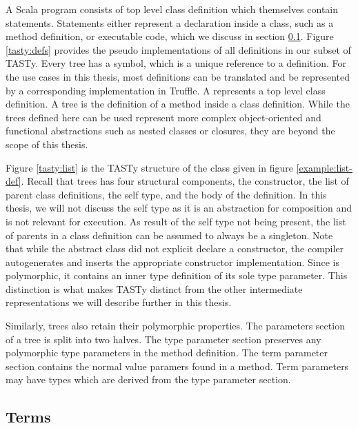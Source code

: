 A Scala program consists of top level class definition which themselves contain statements.
Statements either represent a declaration inside a class, such as a method definition, or executable code, which we discuss in section \ref{section:tasty:terms}.
Figure \ref{tasty:defs} provides the pseudo implementations of all definitions in our subset of TASTy.
Every tree has a symbol, which is a unique reference to a definition.
For the use cases in this thesis, most definitions can be translated and be represented by a corresponding implementation in Truffle.
A  represents a top level class definition.
A  tree is the definition of a method inside a class definition.
While the trees defined here can be used represent more complex object-oriented and functional abstractions such as nested classes or closures, they are beyond the scope of this thesis.

Figure \ref{tasty:list} is the TASTy structure of the  class given in figure \ref{example:list-def}. 
Recall that  trees has four structural components, the constructor, the list of parent class definitions, the self type, and the body of the definition.
In this thesis, we will not discuss the self type as it is an abstraction for composition\cite{gilad:mixins}\cite{scala:calculus} and is not relevant for execution.
As result of the self type not being present, the list of parents in a class definition can be assumed to always be a singleton.
Note that while the abstract  class did not explicit declare a constructor, the compiler autogenerates and inserts the appropriate constructor implementation.
Since  is polymorphic, it contains an inner type definition of its sole type parameter.
This distinction is what makes TASTy distinct from the other intermediate representations we will describe further in this thesis.

Similarly,  trees also retain their polymorphic properties.
The parameters section of a  tree is split into two halves.
The type parameter section preserves any polymorphic type parameters in the method definition.
The term parameter section contains the normal value paramers found in a method.
Term parameters may have types which are derived from the type parameter section.


\subsection{Terms}
\label{section:tasty:terms}

